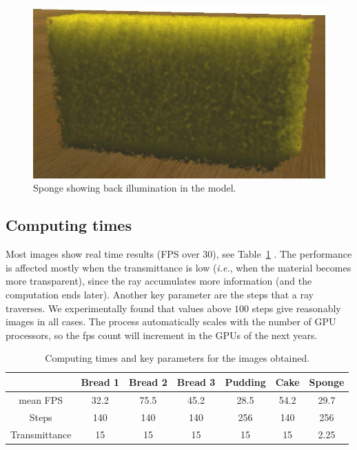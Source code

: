 \documentclass[oneside,a4paper,english,links]{amca}
\begin{document}
\begin{figure}[htb!]
  \centerline{\includegraphics[scale=0.25]{fig7}}
  \caption{Sponge showing back illumination in the model. }
  \label{fg:fig7}
\end{figure}


\subsection{Computing times}
Most images show real time results (FPS over 30), see Table~\ref{tab:n1} . The performance is affected mostly when the transmittance is low ({\em i.e.}, when the material becomes more transparent), since the ray accumulates more information (and the computation ends later). Another key parameter are the steps that a ray traverses. We experimentally found that values above $100$ steps give reasonably images in all cases. The process automatically scales with the number of GPU processors, so the fps count will increment in the GPUs of the next years.

\begin{table}[htb]
\centering
\begin{tabular}{|c|c|c|c|c|c|c|}
\hline &  Bread 1 & Bread 2 & Bread 3 & Pudding & Cake & Sponge \\
\hline
\hline
 mean FPS  & 32.2 &  75.5 &  45.2 & 28.5 &  54.2 & 29.7\\
\hline
 Steps &  140 &  140 &  140 & 256 &  140 & 256 \\
\hline
 Transmittance &  15 &  15 &  15 & 15 &  15 & 2.25 \\
\hline
\end{tabular}
\caption{Computing times and key parameters for the images obtained. }
\label{tab:n1}
\end{table}
\end{document}

